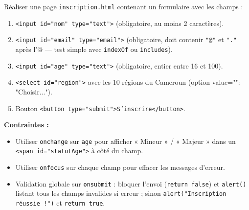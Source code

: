 \documentclass[11pt]{article}
\begin{document}
\begin{exercice}
Réaliser une page \texttt{inscription.html} contenant un formulaire avec les champs :
\begin{enumerate}
    \item \texttt{<input id="nom" type="text">} (obligatoire, au moins 2 caractères).
    \item \texttt{<input id="email" type="email">} (obligatoire, doit contenir \texttt{"@"} et \texttt{"."} après l'@ — test simple avec \texttt{indexOf} ou \texttt{includes}).
    \item \texttt{<input id="age" type="text">} (obligatoire, entier entre 16 et 100).
    \item \texttt{<select id="region">} avec les 10 régions du Cameroun (option value="": "Choisir...").
    \item Bouton \texttt{<button type="submit">S'inscrire</button>}.
\end{enumerate}
\textbf{Contraintes :}
\begin{itemize}
    \item Utiliser \texttt{onchange} sur \texttt{age} pour afficher « Mineur » / « Majeur » dans un \texttt{<span id="statutAge">} à côté du champ.
    \item Utiliser \texttt{onfocus} sur chaque champ pour effacer les messages d'erreur.
    \item Validation globale sur \texttt{onsubmit} : bloquer l'envoi (\texttt{return false}) et \texttt{alert()} listant tous les champs invalides si erreur ; sinon \texttt{alert("Inscription réussie !")} et \texttt{return true}.
\end{itemize}
\end{exercice}
\end{document}
